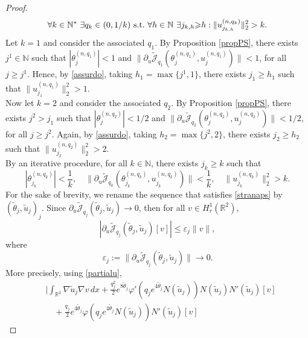 \documentclass[11pt,leqno,twoside,reqno]{amsart}
\numberwithin{equation}{section}
\begin{document}
\begin{proof}
\begin{equation}
\forall k\in\mathbb{N}^* \ \exists q_k\in (0,1/k)\  \hbox{s.t.}\ \forall h\in {\mathbb{N}} \ \exists j_{k,h}{\geqslant} h : \|u^{(n,q_k)}_{j_{k,h}}\|^{2}_{2}> k.
\end{equation}
Let $k=1$ and consider the associated $q_1$. By Proposition \ref{propPS}, there exists $j^1\in {\mathbb{N}}$ such that $|{\theta}_j ^{(n,q_1)}|<1$ and 
$\|\partial_u\tilde{\mathcal J}_{q_1}({\theta}_j ^{(n,q_1)}, u_j ^{(n,q_1)})\|<1$, for all $j{\geqslant} j^1$.
Hence, by \eqref{assurdo}, taking $h_1=\max\{j^1,1\}$, there exists $j_1{\geqslant} h_1$ such that $\|u^{(n,q_1)}_{j_1}\|^{2}_{2}> 1$.
\\
Now let $k=2$ and consider the associated $q_2$. By Proposition \ref{propPS}, there exists $j^2>j_1$ such that $|{\theta}_j ^{(n,q_2)}|<1/2$ and 
$\|\partial_u\tilde{\mathcal J}_{q_2}({\theta}_j ^{(n,q_2)}, u_j ^{(n,q_2)})\|<1/2$, for all $j{\geqslant} j^2$.
Again, by \eqref{assurdo}, taking $h_2=\max\{j^2,2\}$, there exists $j_2{\geqslant} h_2$ such that $\|u^{(n,q_2)}_{j_2}\|^{2}_{2}> 2$.
\\
By an iterative procedure, for all $k\in {\mathbb{N}}$, there exists $j_k{\geqslant} k$ such that 
\begin{equation} \label{stranaps}
|{\theta}_{j_k} ^{(n,q_k)}|<\frac 1k,\quad
\|\partial_u\tilde{\mathcal J}_{q_k}({\theta}_{j_k} ^{(n,q_k)}, u_{j_k} ^{(n,q_k)})\|<\frac 1k, 
\quad
\|u^{(n,q_k)}_{j_k}\|^{2}_{2}> k.
\end{equation}
For the sake of brevity, we rename the sequence that satisfies \eqref{stranaps} by  $(\tilde{\theta}_j,\tilde{u}_j)_j$.  
Since $\partial_u\tilde{\mathcal J}_{q_j}(\tilde{\theta}_j, 
\tilde{u}_j)\rightarrow 0$, then for all $v\in H_r^1(\mathbb R^2)$,
\begin{equation*}
 | \partial_u\tilde{\mathcal J}_{q_j}(\tilde{\theta}_j, \tilde{u}_j)[ v]  |{\leqslant} \varepsilon_j \|v\|,
\end{equation*}
where
\begin{equation*} \varepsilon_j:=\|\partial_u\tilde{\mathcal J}_{q_j}(\tilde{\theta}_j, \tilde{u}_j)\|\rightarrow 0.
\end{equation*}
More precisely, using \eqref{partialu},
\begin{equation}\label{big1}
\begin{split}
& \Big| \int_{\mathbb R^{2}} \nabla \tilde{u}_j \nabla v \,dx+
\frac{q_j^2}{2}e^{8\tilde{\theta}_j}\varphi'(q_j e^{4\tilde{\theta}_j}N(\tilde{u}_j))N(\tilde{u}_j) N'(\tilde{u}_j)[v] \\
& \quad+\frac{q_j}{2}e^{4\tilde{\theta}_j}\varphi(q_j e^{4\tilde{\theta}_j}N(\tilde{u}_j))N'(\tilde{u}_j)[v] 

\end{split}
\end{equation}
\end{proof}
\end{document}
